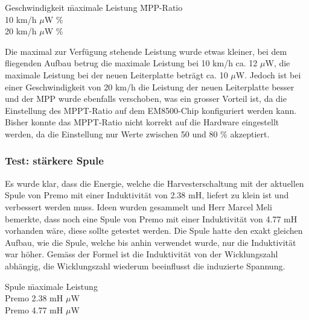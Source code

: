 
\begin{tabbing}
    Geschwindigkeit   \quad\= maximale Leistung    \quad\= MPP-Ratio\\[0.8ex]
    10 km/h         $\mu$W   \%\\
	20 km/h         $\mu$W   \%\\
	
\end{tabbing} %

Die maximal zur Verfügung stehende Leistung wurde etwas kleiner, bei dem fliegenden Aufbau betrug die maximale Leistung bei 10 km/h ca. 12 $\mu$W, die maximale Leistung bei der neuen Leiterplatte beträgt ca. 10 $\mu$W. Jedoch ist bei einer Geschwindigkeit von 20 km/h die Leistung der neuen Leiterplatte besser und der MPP wurde ebenfalls verschoben, was ein grosser Vorteil ist, da die Einstellung des MPPT-Ratio auf dem EM8500-Chip konfiguriert werden kann. Bisher konnte das MPPT-Ratio nicht korrekt auf die Hardware eingestellt werden, da die Einstellung nur Werte zwischen 50 und 80 \% akzeptiert.

\subsubsection{Test: stärkere Spule}

Es wurde klar, dass die Energie, welche die Harvesterschaltung mit der aktuellen Spule von Premo mit einer Induktivität von 2.38 mH, liefert zu klein ist und verbessert werden muss. Ideen wurden gesammelt und Herr Marcel Meli bemerkte, dass noch eine Spule von Premo mit einer Induktivität von 4.77 mH vorhanden wäre, diese sollte getestet werden. Die Spule hatte den exakt gleichen Aufbau, wie die Spule, welche bis anhin verwendet wurde, nur die Induktivität war höher. Gemäss der Formel  ist die Induktivität von der Wicklungszahl abhängig, die Wicklungszahl wiederum beeinflusst die induzierte Spannung.

\begin{tabbing}
    Spule   \quad\= maximale Leistung    \\[0.8ex]
    Premo 2.38 mH         $\mu$W\\
	Premo 4.77 mH         $\mu$W\\
	
\end{tabbing} %

